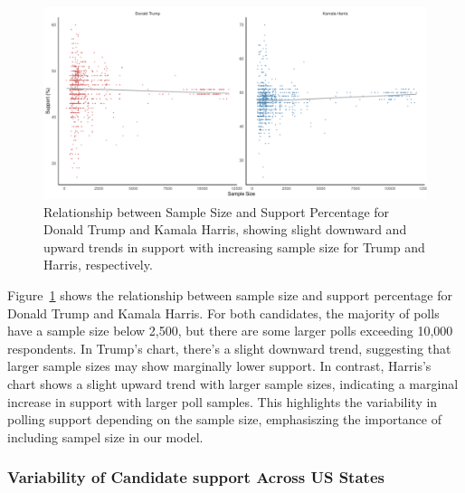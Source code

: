 \documentclass[
  letterpaper,
  DIV=11,
  numbers=noendperiod]{scrartcl}
\begin{document}
\begin{figure}

{\centering \includegraphics{paper_files/figure-pdf/fig-pct-1.pdf}

}

\caption{\label{fig-pct}Relationship between Sample Size and Support
Percentage for Donald Trump and Kamala Harris, showing slight downward
and upward trends in support with increasing sample size for Trump and
Harris, respectively.}

\end{figure}

Figure~\ref{fig-pct} shows the relationship between sample size and
support percentage for Donald Trump and Kamala Harris. For both
candidates, the majority of polls have a sample size below 2,500, but
there are some larger polls exceeding 10,000 respondents. In Trump's
chart, there's a slight downward trend, suggesting that larger sample
sizes may show marginally lower support. In contrast, Harris's chart
shows a slight upward trend with larger sample sizes, indicating a
marginal increase in support with larger poll samples. This highlights
the variability in polling support depending on the sample size,
emphasiszing the importance of including sampel size in our model.

\hypertarget{variability-of-candidate-support-across-us-states}{%
\subsubsection{Variability of Candidate support Across US
States}\label{variability-of-candidate-support-across-us-states}}
\end{document}
